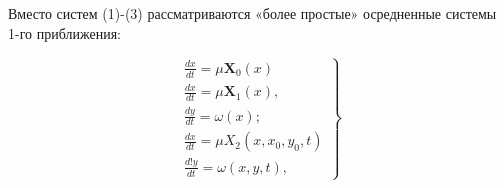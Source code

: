 \documentclass[10pt]{article}
\begin{document}
Вместо систем (1)-(3) рассматриваются «более простые» осредненные системы 1-го приближения:



\[

\left.\begin{array}{c}

\frac{d x}{d t}=\mu \boldsymbol{X}_{0}(x) \\

\frac{d x}{d t}=\mu \boldsymbol{X}_{1}(x), \quad \\

\frac{d y}{d t}=\omega(x) ; \\

\frac{d x}{d t}=\mu X_{2}\left(x, x_{0}, y_{0}, t\right) \\

\frac{d ! y}{d t}=\omega(x, y, t),

\end{array}\right\}

\]
\end{document}
